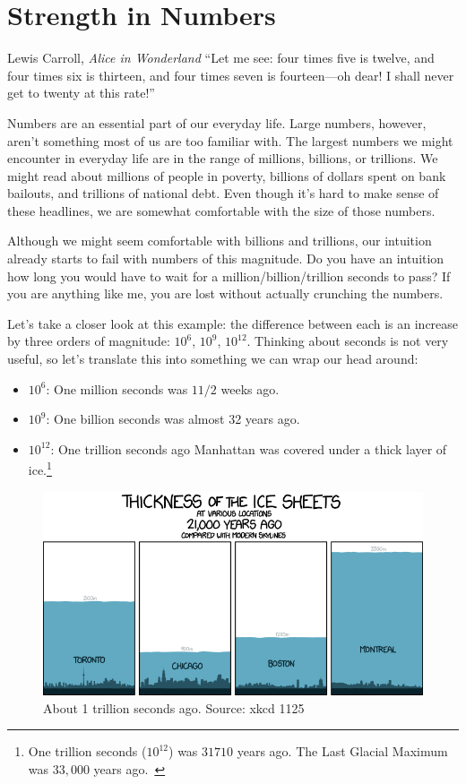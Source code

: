 \chapter{Strength in Numbers}
\label{les:15}

\begin{chapquote}{Lewis Carroll, \textit{Alice in Wonderland}}
``Let me see: four times five is twelve, and four times six is thirteen, and
four times seven is fourteen—oh dear! I shall never get to twenty at this
rate!''
\end{chapquote}

Numbers are an essential part of our everyday life. Large numbers,
however, aren't something most of us are too familiar with. The largest
numbers we might encounter in everyday life are in the range of
millions, billions, or trillions. We might read about millions of people
in poverty, billions of dollars spent on bank bailouts, and trillions of
national debt. Even though it's hard to make sense of these headlines,
we are somewhat comfortable with the size of those numbers.

Although we might seem comfortable with billions and trillions, our
intuition already starts to fail with numbers of this magnitude. Do you
have an intuition how long you would have to wait for a
million/billion/trillion seconds to pass? If you are anything like me,
you are lost without actually crunching the numbers.

Let's take a closer look at this example: the difference between each is an
increase by three orders of magnitude: $10^6$, $10^9$, $10^{12}$. Thinking about
seconds is not very useful, so let's translate this into something we can wrap
our head around:

\begin{itemize}
  \item $10^6$: One million seconds was $1 1/2$ weeks ago.
  \item $10^9$: One billion seconds was almost 32 years ago.
  \item $10^{12}$: One trillion seconds ago Manhattan was covered under a thick
  layer of ice.\footnote{One trillion seconds ($10^{12}$) was $31710$ years ago. The Last Glacial
  Maximum was $33,000$ years ago.~\cite{wiki:LGM}}
\end{itemize}

\begin{figure}
  \includegraphics{assets/images/xkcd-1125.png}
  \caption{About 1 trillion seconds ago. Source: xkcd 1125}
  \label{fig:xkcd-1125}
\end{figure}

